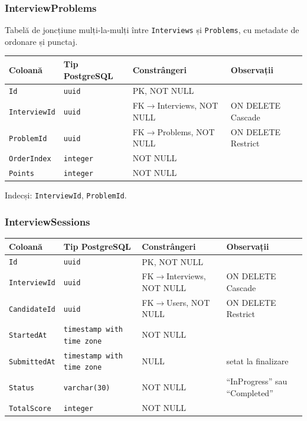 \subsubsection{InterviewProblems}

Tabelă de joncțiune mulți-la-mulți între \texttt{Interviews} și
\texttt{Problems}, cu metadate de ordonare și punctaj.

\begin{tabular}{llll}
\hline
\textbf{Coloană} & \textbf{Tip PostgreSQL} & \textbf{Constrângeri} & \textbf{Observații} \\
\hline
\texttt{Id}          & \texttt{uuid}    & PK, NOT NULL                  & \\
\texttt{InterviewId} & \texttt{uuid}    & FK$\rightarrow$Interviews, NOT NULL       & ON DELETE Cascade \\
\texttt{ProblemId}   & \texttt{uuid}    & FK$\rightarrow$Problems, NOT NULL         & ON DELETE Restrict \\
\texttt{OrderIndex}  & \texttt{integer} & NOT NULL                      & \\
\texttt{Points}      & \texttt{integer} & NOT NULL                      & \\
\hline
\end{tabular}

\medskip
Indecși: \texttt{InterviewId}, \texttt{ProblemId}.

\subsubsection{InterviewSessions}

\begin{tabular}{llll}
\hline
\textbf{Coloană} & \textbf{Tip PostgreSQL} & \textbf{Constrângeri} & \textbf{Observații} \\
\hline
\texttt{Id}          & \texttt{uuid}           & PK, NOT NULL               & \\
\texttt{InterviewId} & \texttt{uuid}           & FK$\rightarrow$Interviews, NOT NULL    & ON DELETE Cascade \\
\texttt{CandidateId} & \texttt{uuid}           & FK$\rightarrow$Users, NOT NULL         & ON DELETE Restrict \\
\texttt{StartedAt}   & \texttt{timestamp with time zone} & NOT NULL         & \\
\texttt{SubmittedAt} & \texttt{timestamp with time zone} & NULL             & setat la finalizare \\
\texttt{Status}      & \texttt{varchar(30)}    & NOT NULL                   & ``InProgress'' sau ``Completed'' \\
\texttt{TotalScore}  & \texttt{integer}        & NOT NULL                   & \\
\hline
\end{tabular}

